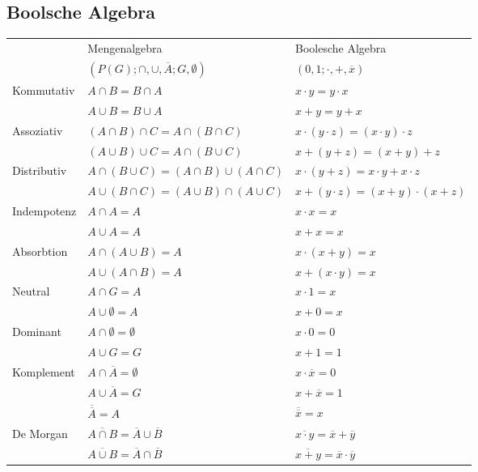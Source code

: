 \documentclass[6pt,a4paper]{scrartcl}
\begin{document}
\begin{multicols}{3}
\section{Boolsche Algebra}
	\begin{tabular}{l|l|l}
		& Mengenalgebra & Boolesche Algebra \\ 
		& $(P(G);\cap , \cup, \overline{A};G,\emptyset )$ & $({0,1};\cdot , +, \overline{x})$ \\ \midrule
		Kommutativ 		& $A \cap B = B \cap A$ & $x \cdot y = y \cdot x$  \\ 
						& $A \cup B = B \cup A$ & $x + y = y + x$\\
		Assoziativ 		& $(A \cap B) \cap C = A \cap (B \cap C)$ & $x \cdot (y \cdot z) = (x \cdot y) \cdot z$\\
						& $(A \cup B) \cup C = A \cap (B \cup C)$ & $x + (y + z) = (x + y) + z$\\
		Distributiv 	& $A \cap (B \cup C) = (A \cap B) \cup (A \cap C)$ & $x \cdot (y + z) = x \cdot y + x \cdot z$\\
						& $A \cup (B \cap C) = (A \cup B) \cap (A \cup C)$ & $x + (y \cdot z) = (x + y) \cdot (x + z)$\\
		Indempotenz		& $A \cap A = A$ & $x \cdot x = x$ \\
						& $A \cup A = A$ & $x + x = x$\\
		Absorbtion		& $A \cap (A \cup B) = A$ & $x \cdot (x+y) = x$ \\
						& $A \cup (A \cap B) = A$ & $x + (x \cdot y) = x$ \\
		Neutral			& $A \cap G = A$ & $x \cdot 1 = x$ \\
						& $A \cup \emptyset = A$ & $x + 0 = x$ \\
		Dominant		& $A \cap \emptyset = \emptyset$ & $x \cdot 0 = 0$ \\
						& $A \cup G = G$ & $x + 1 = 1$ \\
		Komplement		& $A \cap \overline{A} = \emptyset$ & $x \cdot \overline{x} = 0$\\
						& $A \cup \overline{A} = G$ & $x + \overline{x} = 1$\\
						& $\overline{\overline{A}} = A$ & $\overline{\overline{x}} = x$\\
		De Morgan		& $\overline{A \cap B} = \overline{A} \cup \overline{B}$ & $\overline{x \cdot y} = \overline{x} + \overline{y}$\\
						& $\overline{A \cup B} = \overline{A} \cap \overline{B}$ & $\overline{x + y} = \overline{x} \cdot \overline{y}$\\


\end{tabular}
\end{multicols}
\end{document}
